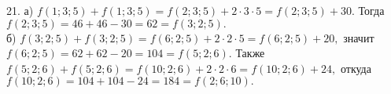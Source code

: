 21. а) $f(1;3;5)+f(1;3;5)=f(2;3;5)+2\cdot3\cdot5=f(2;3;5)+30.$ Тогда $f(2;3;5)=46+46-30=62=f(3;2;5).$\\
б) $f(3;2;5)+f(3;2;5)=f(6;2;5)+2\cdot2\cdot5=f(6;2;5)+20,$ значит $f(6;2;5)=62+62-20=104=f(5;2;6).$ Также
$f(5;2;6)+f(5;2;6)=f(10;2;6)+2\cdot2\cdot6=f(10;2;6)+24,$ откуда $f(10;2;6)=104+104-24=184=f(2;6;10).$\\
